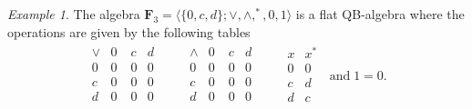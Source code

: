 \documentclass[12pt]{amsart}
\theoremstyle{definition}
\theoremstyle{remark}
\newtheorem{example}{Example}[section]
\numberwithin{equation}{section}
\begin{document}
\begin{example}\label{Example F3}\cite{QB}
The algebra $\mathbf{F}_{3} = \langle \{0,c,d\} ; \vee ,\wedge ,^\ast, 0, 1 \rangle$ is a flat QB-algebra where the operations are given by the  following tables\\
\begin{eqnarray*}
\begin{array}{c|ccccccccc} \vee & 0\; & c& d \\ \hline 0 & 0 & 0& 0  \\ c & 0 & 0& 0 \\ d & 0 & 0& 0  \\
\end{array}\qquad
\begin{array}{c|ccccccccc} \wedge & 0\; & c & d\\ \hline 0 & 0 & 0& 0   \\ c & 0 & 0& 0 \\ d & 0 & 0& 0  \\
\end{array}\qquad
\begin{array}{c|ccccccccc} x & x^{*}   \\ \hline 0 & 0 \\ c & d\\ d & c \\  \end{array} \;\;\mathrm{and}\; 1=0.
\end{eqnarray*}
\end{example}
\end{document}
